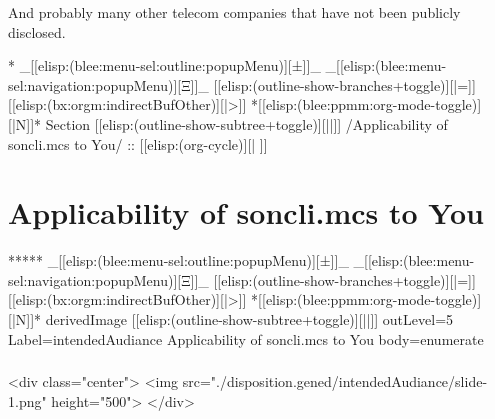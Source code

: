 \begin{whenOrg}
\begin{verblatex}
\begin{frame}[fragile,plain,label=nokiaClientsList]
And probably many other telecom companies that have not been publicly disclosed.


\end{frame}
\end{verblatex}


\begin{whenOrg}
*  _[[elisp:(blee:menu-sel:outline:popupMenu)][±]]_ _[[elisp:(blee:menu-sel:navigation:popupMenu)][Ξ]]_ [[elisp:(outline-show-branches+toggle)][|=]] [[elisp:(bx:orgm:indirectBufOther)][|>]] *[[elisp:(blee:ppmm:org-mode-toggle)][|N]]*  Section    [[elisp:(outline-show-subtree+toggle)][||]]   /Applicability of soncli.mcs to You/ ::  [[elisp:(org-cycle)][| ]]
\end{whenOrg}

\section{Applicability of soncli.mcs to You}


\begin{whenOrg}
*****  _[[elisp:(blee:menu-sel:outline:popupMenu)][±]]_ _[[elisp:(blee:menu-sel:navigation:popupMenu)][Ξ]]_ [[elisp:(outline-show-branches+toggle)][|=]] [[elisp:(bx:orgm:indirectBufOther)][|>]] *[[elisp:(blee:ppmm:org-mode-toggle)][|N]]*  derivedImage [[elisp:(outline-show-subtree+toggle)][||]] outLevel=5 Label=intendedAudiance Applicability of soncli.mcs to You body=enumerate
\end{whenOrg}

\begin{htmlonly}

\begin{frame}[fragile,plain,label=intendedAudiance]
    \frametitle{}
    \framesubtitle{}
    \begin{rawhtml}
<div class="center">
<img src="./disposition.gened/intendedAudiance/slide-1.png" height="500">
</div>
    \end{rawhtml}
\end{frame}
\end{htmlonly}


\end{whenOrg}
